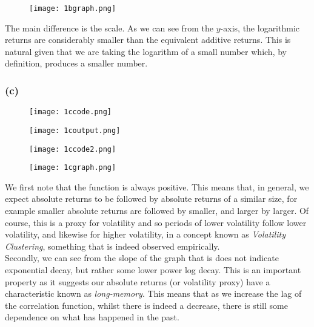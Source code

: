 \documentclass{article}
\begin{document}
\begin{figure}[!]
\texttt{[image: 1bgraph.png]}
\centering
\end{figure}

The main difference is the scale. As we can see from the $y$-axis, the logarithmic returns are considerably smaller than the equivalent additive returns. This is natural given that we are taking the logarithm of a small number which, by definition, produces a smaller number. 

\subsubsection*{(c)}

\begin{figure}[h]
\texttt{[image: 1ccode.png]}
\centering
\end{figure}

\begin{figure}[h]
\texttt{[image: 1coutput.png]}
\centering
\end{figure}

\begin{figure}[h]
\texttt{[image: 1ccode2.png]}
\centering
\end{figure}

\begin{figure}[!]
\texttt{[image: 1cgraph.png]}
\centering
\end{figure}

\newpage

We first note that the function is always positive. This means that, in general, we expect absolute returns to be followed by absolute returns of a similar size, for example smaller absolute returns are followed by smaller, and larger by larger. Of course, this is a proxy for volatility and so periods of lower volatility follow lower volatility, and likewise for higher volatility, in a concept known as \textit{Volatility Clustering}, something that is indeed observed empirically. \\

Secondly, we can see from the slope of the graph that is does not indicate exponential decay, but rather some lower power log decay. This is an important property as it suggests our absolute returns (or volatility proxy) have a characteristic known as \textit{long-memory}. This means that as we increase the lag of the correlation function, whilst there is indeed a decrease, there is still some dependence on what has happened in the past. 
\end{document}
